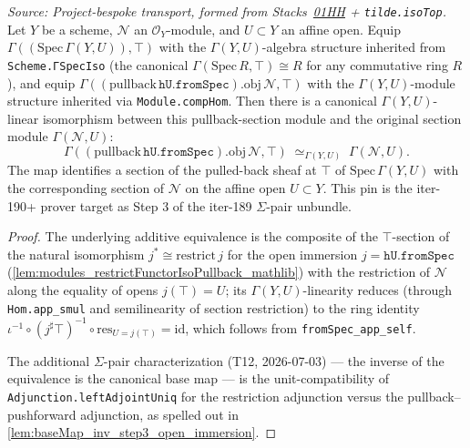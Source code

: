 \begin{lemma}

  \label{lem:pullback_of_openImmersion_iso_restrict}
  \textit{Source: Project-bespoke transport, formed from
  Stacks~\href{https://stacks.math.columbia.edu/tag/01HH}{01HH} +
  \texttt{tilde.isoTop}.}
  Let \(Y\) be a scheme, \(\mathcal N\) an \(\mathcal O_Y\)-module, and
  \(U \subset Y\) an affine open. Equip \(\Gamma((\mathrm{Spec}\,\Gamma(Y, U)),
  \top)\) with the \(\Gamma(Y, U)\)-algebra structure inherited from
  \texttt{Scheme.ΓSpecIso} (the canonical
  \(\Gamma(\mathrm{Spec}\,R, \top) \cong R\) for any commutative ring \(R\)),
  and equip
  \(\Gamma((\text{pullback}\,\mathtt{hU.fromSpec}).\mathrm{obj}\,\mathcal N,
  \top)\) with the \(\Gamma(Y, U)\)-module structure inherited via
  \texttt{Module.compHom}. Then there is a canonical \(\Gamma(Y, U)\)-linear
  isomorphism between this pullback-section module and the original section
  module \(\Gamma(\mathcal N, U)\):
  \[
    \Gamma((\text{pullback}\,\mathtt{hU.fromSpec}).\mathrm{obj}\,\mathcal N,
      \top)
    \;\simeq_{\Gamma(Y, U)}\;
    \Gamma(\mathcal N, U).
  \]
  The map identifies a section of the pulled-back sheaf at \(\top\) of
  \(\mathrm{Spec}\,\Gamma(Y, U)\) with the corresponding section of
  \(\mathcal N\) on the affine open \(U \subset Y\). This pin is the
  iter-190+ prover target as Step 3 of the iter-189 \(\Sigma\)-pair
  unbundle.
\end{lemma}
\begin{proof}
  \leanok
  The underlying additive equivalence is the composite of the
  \(\top\)-section of the natural isomorphism
  \(j^{*} \cong \mathrm{restrict}\,j\) for the open immersion
  \(j = \mathtt{hU.fromSpec}\)
  (\cref{lem:modules_restrictFunctorIsoPullback_mathlib}) with the
  restriction of \(\mathcal N\) along the equality of opens
  \(j(\top) = U\); its \(\Gamma(Y, U)\)-linearity reduces (through
  \texttt{Hom.app\_smul} and semilinearity of section restriction) to
  the ring identity
  \(\iota^{-1} \circ (j^{\sharp}\top)^{-1} \circ
    \mathrm{res}_{U = j(\top)} = \mathrm{id}\), which follows from
  \texttt{fromSpec\_app\_self}.

  The additional \(\Sigma\)-pair characterization (T12, 2026-07-03) —
  the inverse of the equivalence is the canonical base map — is the
  unit-compatibility of \texttt{Adjunction.leftAdjointUniq} for the
  restriction adjunction versus the pullback--pushforward adjunction,
  as spelled out in \cref{lem:baseMap_inv_step3_open_immersion}.
\end{proof}


